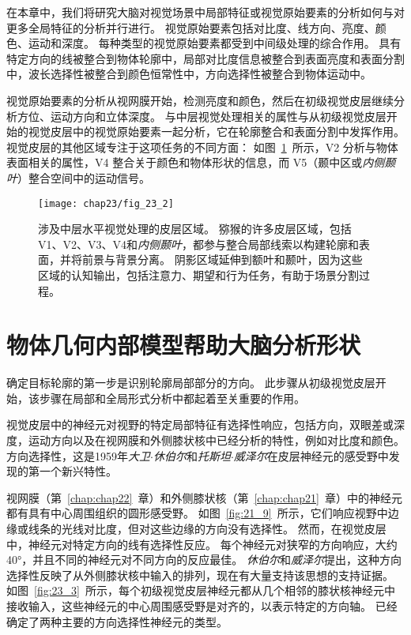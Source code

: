 在本章中，我们将研究大脑对视觉场景中局部特征或视觉原始要素的分析如何与对更多全局特征的分析并行进行。
视觉原始要素包括对比度、线方向、亮度、颜色、运动和深度。
每种类型的视觉原始要素都受到中间级处理的综合作用。
具有特定方向的线被整合到物体轮廓中，局部对比度信息被整合到表面亮度和表面分割中，波长选择性被整合到颜色恒常性中，方向选择性被整合到物体运动中。


视觉原始要素的分析从视网膜开始，检测亮度和颜色，然后在初级视觉皮层继续分析方位、运动方向和立体深度。
与中层视觉处理相关的属性与从初级视觉皮层开始的视觉皮层中的视觉原始要素一起分析，它在轮廓整合和表面分割中发挥作用。
视觉皮层的其他区域专注于这项任务的不同方面：
如图~\ref{fig:23_2}~所示，V2 分析与物体表面相关的属性，V4 整合关于颜色和物体形状的信息，而 V5（颞中区或\textit{内侧颞叶}）整合空间中的运动信号。


\begin{figure}[htbp]
	\centering
	\texttt{[image: chap23/fig\_23\_2]}
	\caption{涉及中层水平视觉处理的皮层区域。
		猕猴的许多皮层区域，包括V1、V2、V3、V4和\textit{内侧颞叶}，都参与整合局部线索以构建轮廓和表面，并将前景与背景分离。
		阴影区域延伸到额叶和颞叶，因为这些区域的认知输出，包括注意力、期望和行为任务，有助于场景分割过程。}
	\label{fig:23_2}
\end{figure}



\section{物体几何内部模型帮助大脑分析形状}

确定目标轮廓的第一步是识别轮廓局部部分的方向。
此步骤从初级视觉皮层开始，该步骤在局部和全局形式分析中都起着至关重要的作用。


视觉皮层中的神经元对视野的特定局部特征有选择性响应，包括方向，双眼差或深度，运动方向以及在视网膜和外侧膝状核中已经分析的特性，例如对比度和颜色。 
方向选择性，这是1959年\textit{大卫$\cdot$休伯尔}和\textit{托斯坦$\cdot$威泽尔}在皮层神经元的感受野中发现的第一个新兴特性。


视网膜（第~\ref{chap:chap22}~章）和外侧膝状核（第~\ref{chap:chap21}~章）中的神经元都有具有中心周围组织的圆形感受野。
如图~\ref{fig:21_9}~所示，它们响应视野中边缘或线条的光线对比度，但对这些边缘的方向没有选择性。
然而，在视觉皮层中，神经元对特定方向的线有选择性反应。
每个神经元对狭窄的方向响应，大约40°，并且不同的神经元对不同方向的反应最佳。
\textit{休伯尔}和\textit{威泽尔}提出，这种方向选择性反映了从外侧膝状核中输入的排列，现在有大量支持该思想的支持证据。
如图~\ref{fig:23_3}~所示，每个初级视觉皮层神经元都从几个相邻的膝状核神经元中接收输入，这些神经元的中心周围感受野是对齐的，以表示特定的方向轴。
已经确定了两种主要的方向选择性神经元的类型。


